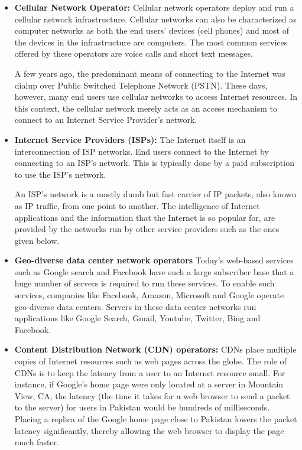 \begin{itemize}
\item \textbf{Cellular Network Operator:} Cellular network operators deploy and run a cellular network infrastructure. Cellular networks can also be characterized as computer networks as both the end users' devices (cell phones) and most of the devices in the infrastructure are computers. The most common services offered by these operators are voice calls and short text messages. 

A few years ago, the predominant means of connecting to the Internet was dialup over Public Switched Telephone Network (PSTN). These days, however, many end users use cellular networks to access Internet resources. In this context, the cellular network merely acts as an access mechanism to connect to an Internet Service Provider's network.


\item \textbf{Internet Service Providers (ISPs):} The Internet itself is an interconnection of ISP networks. End users connect to the Internet by connecting to an ISP's network. This is typically done by a paid subscription to use the ISP's network. 

An ISP's network is a mostly dumb but fast carrier of IP packets, also known as IP traffic, from one point to another. The intelligence of Internet applications and the information that the Internet is so popular for, are provided by the networks run by other service providers such as the ones given below.
\item \textbf{Geo-diverse data center network operators} Today's web-based services such as Google search and Facebook have such a large subscriber base that a huge number of servers is required to run these services. To enable such services, companies like Facebook, Amazon, Microsoft and Google operate geo-diverse data centers. Servers in these data center networks run applications like Google Search, Gmail, Youtube, Twitter, Bing and Facebook.
\item \textbf{Content Distribution Network (CDN) operators:} CDNs place multiple copies of Internet resources such as web pages across the globe. The role of CDNs is to keep the latency from a user to an Internet resource small. For instance, if Google's home page were only located at a server in Mountain View, CA, the latency (the time it takes for a web browser to send a packet to the server) for users in Pakistan would be hundreds of milliseconds. Placing a replica of the Google home page close to Pakistan lowers the packet latency significantly, thereby allowing the web browser to display the page much faster.
\end{itemize}


